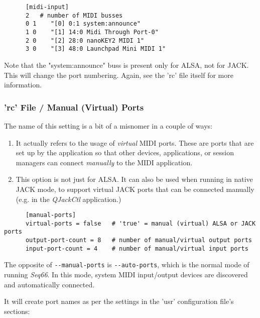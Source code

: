    \begin{verbatim}
      [midi-input]
      2   # number of MIDI busses
      0 1    "[0] 0:1 system:announce"
      1 0    "[1] 14:0 Midi Through Port-0"
      2 0    "[2] 28:0 nanoKEY2 MIDI 1"
      3 0    "[3] 48:0 Launchpad Mini MIDI 1"
   \end{verbatim}

   Note that the "system:announce" buss is present only for ALSA, not for JACK.
   This will change the port numbering.
   Again, see the 'rc' file itself for more information.

\subsubsection{'rc' File / Manual (Virtual) Ports}
\label{subsubsec:configuration_rc_manual_ports}

   The name of this setting is a bit of a misnomer in a couple of ways:

   \begin{enumerate}
      \item It actually refers to the usage of \textsl{virtual} MIDI ports.
         These are ports that are set up by the application so that other
         devices, applications, or session managers can connect
         \textsl{manually} to the MIDI application.
      \item This option is not just for ALSA.  It can also be used when
         running in native JACK mode, to support
         virtual JACK ports that can be connected manually (e.g. in the
         \textsl{QJackCtl} application.)
   \end{enumerate}

   \begin{verbatim}
      [manual-ports]
      virtual-ports = false   # 'true' = manual (virtual) ALSA or JACK ports
      output-port-count = 8   # number of manual/virtual output ports
      input-port-count = 4    # number of manual/virtual input ports
   \end{verbatim}

   The opposite of \texttt{-{}-manual-ports} is \texttt{-{}-auto-ports},
   which is the normal mode of running \textsl{Seq66}.
   In this mode, system MIDI input/output devices are discovered and
   automatically connected.

   It will create port names as per the settings in the 'usr' configuration
   file's sections:

